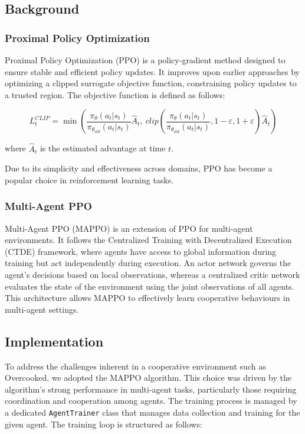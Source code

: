 \documentclass{article}
\begin{document}
\subsection{Background}
\subsubsection{Proximal Policy Optimization}
Proximal Policy Optimization (PPO) \cite{ppo} is a policy-gradient method designed to ensure stable and efficient policy updates. It improves upon earlier approaches by optimizing a clipped surrogate objective function, constraining policy updates to a trusted region. The objective function is defined as follows:

\begin{equation}
L^{CLIP}_t = \min(\frac{\pi_\theta(a_t | s_t)}{\pi_{\theta_{old}}(a_t | s_t)} \hat{A}_t,\ clip(\frac{\pi_\theta(a_t | s_t)}{\pi_{\theta_{old}}(a_t | s_t)}, 1 - \varepsilon, 1 + \varepsilon) \hat{A}_t)
\end{equation}

where $\hat{A}_t$ is the estimated advantage at time $t$.

Due to its simplicity and effectiveness across domains, PPO has become a popular choice in reinforcement learning tasks.

\subsubsection{Multi-Agent PPO}
Multi-Agent PPO (MAPPO) \cite{mappo} is an extension of PPO for multi-agent environments. It follows the Centralized Training with Decentralized Execution (CTDE) framework, where agents have access to global information during training but act independently during execution. An actor network governs the agent's decisions based on local observations, whereas a centralized critic network evaluates the state of the environment using the joint observations of all agents. This architecture allows MAPPO to effectively learn cooperative behaviours in multi-agent settings.

\subsection{Implementation}
To address the challenges inherent in a cooperative environment such as Overcooked, we adopted the MAPPO algorithm. This choice was driven by the algorithm's strong performance in multi-agent tasks, particularly those requiring coordination and cooperation among agents. The training process is managed by a dedicated \texttt{AgentTrainer} class that manages data collection and training for the given agent. The training loop is structured as follows:
\end{document}
